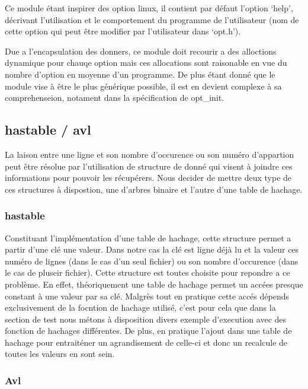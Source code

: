 \documentclass[12pt]{article}
\begin{document}
        Ce module étant inspirer des option linux, il contient par défaut 
        l'option `help', décrivant l'utilisation et le comportement du 
        programme de l'utilisateur (nom de cette option qui peut être modifier 
        par l'utilisateur dans `opt.h'). 

        Due a l'encapsulation des donners, ce module doit recourir a des 
        alloctions dynamique pour chauqe option mais ces allocations sont 
        raisonable en vue du nombre d'option en moyenne d'un programme. De plus
         étant donné que le module vise à être le plus générique possible, il
          est en devient complexe à sa comprehenseion, notament dans la 
          spécification de opt\_init. 

    \subsection{hastable / avl}

    La laison entre une ligne et son nombre d'occurence ou son numéro 
    d'appartion peut être résolue par l'utilisation de structure de donné qui 
    visent à joindre ces informations pour pouvoir les récupérers. Nous decider 
    de mettre deux type de ces structures à dispostion, une d'arbres binaire 
    et l'autre d'une table de hachage. 

    \subsubsection{hastable}

    Constituant l'implémentation d'une table de hachage, cette structure permet 
    a partir d'une clé une valeur. Dans notre cas la clé est ligne déjà lu et 
    la valeur ces numéro de lignes (dans le cas d'un seul fichier) ou son 
    nombre d'occurence (dans le cas de pluseir fichier). Cette structure est 
    toutes choisite pour repondre a ce problème. En effet, théoriquement une 
    table de hachage permet un accées presque constant à une valeur par sa clé. 
    Malgrès tout en pratique cette accés dépends exclusivement de la focntion 
    de hachage utilisé, c'est pour cela que dans la section de test nous métons 
    à disposition divers exemple d'execution avec des fonction de hachages 
    différentes. De plus, en pratique l'ajout dans une table de hachage pour 
    entraiténer un agrandisement de celle-ci et donc un recalcule de toutes les 
    valeurs en sont sein.  

    \subsubsection{Avl}
\end{document}
